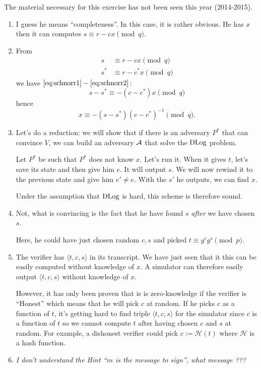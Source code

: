 \newape

\begin{solution}
  The material necessary for this exercise has not been seen this year (2014-2015).
\end{solution}

\begin{solution}
  \begin{enumerate}
    \item I guess he means ``completeness''.
      In this case, it is rather obvious.
      He has $x$ then it can computes $s \equiv r - cx \pmod{q}$.
    \item From
      \begin{align}
        \label{eq:schnorr1}
        s   & \equiv r - c  x \pmod{q}\\
        \label{eq:schnorr2}
        s^* & \equiv r - c^*x \pmod{q}
      \end{align}
      we have $\eqref{eq:schnorr1} - \eqref{eq:schnorr2}$:
      \[ s - s^* \equiv -(c - c^*)x \pmod{q} \]
      hence
      \[ x \equiv -(s - s^*)(c - c^*)^{-1} \pmod{q}. \]
    \item
      Let's do a reduction: we will show that if there is an
      adversary $P^*$ that can convince $V$, we can build an adversary $\mathcal{A}$ that solve the $\operatorname{DLog}$ problem.

      Let $P^*$ be such that $P^*$ does not know $x$.
      Let's run it.
      When it gives $t$, let's save its state and then give him $e$.
      It will output $s$.
      We will now rewind it to the previous state and give him $e' \neq e$.
      With the $s'$ he outputs, we can find $x$.

      Under the assumption that $\operatorname{DLog}$ is hard, this scheme is therefore sound.
    \item
      Not, what is convincing is the fact that he have found $s$ \emph{after} we have chosen
      $s$.

      Here, he could have just chosen random $c, s$ and picked $t \equiv y^cg^s \pmod{p}$.
    \item
      The verifier has $\langle t,c,s \rangle$ in its transcript.
      We have just seen that it this can be easily computed without knowledge of $x$.
      A simulator can therefore easily output $\langle t,c,s \rangle$ without knowledge of $x$.

      However, it has only been proven that is is zero-knowledge
      if the verifier is ``Honest'' which means that he will pick $c$ at random.
      If he picks $c$ as a function of $t$, it's getting hard to find triple $\langle t,c,s \rangle$
      for the simulator since $c$ is a function of $t$ so we cannot compute $t$ after having chosen
      $c$ and $s$ at random.
      For example, a dishonest verifier could pick $c := \mathcal{H}(t)$ where $\mathcal{H}$ is a hash function.
    \item \emph{I don't understand the Hint ``$m$ is the message to sign'', what message ???}


\end{enumerate}
\end{solution}
